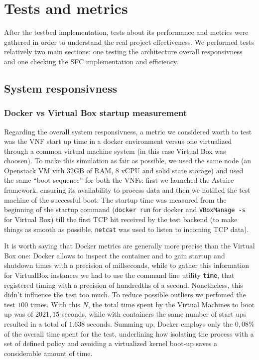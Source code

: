\chapter{Tests and metrics}

After the testbed implementation, tests about its performance and metrics were
gathered in order to understand the real project effectiveness. We performed
tests relatively two main sections: one testing the architecture overall
responsivness and one checking the SFC implementation and efficiency.

\section{System responsivness}

\subsection{Docker vs Virtual Box startup measurement}

Regarding the overall system responsivness, a metric we considered worth to 
test was the VNF start up time in a docker environment versus one virtualized 
through a common virtual machine system (in this case Virtual Box was choosen). 
To make this simulation as fair as possible, we used the same node (an 
Openstack VM vith 32GB of RAM, 8 vCPU and solid state storage) and used the same 
``boot sequence'' for both the VNFs: first we launched the Astaire framework, 
ensuring its availability to process data and then we notified the test 
machine of the successful boot. The startup time was measured from the 
beginning of the startup command (\verb!docker run! for docker and 
\verb!VBoxManage -s! for Virtual Box) till the first TCP hit received by the 
test backend (to make things as smooth as possible, \verb!netcat! was used 
to listen to incoming TCP data).

It is worth saying that Docker metrics are generally more precise than the
Virtual Box one: Docker allows to inspect the container and to gain startup and
shutdown times with a precision of millseconds, while to gather this information
for VirtualBox instances we had to use the command line utility \verb!time!,
that registered timing with a precision of hundredths of a second. Nonetheless,
this didn't influence the test too much. To reduce possible outliers we perfomed
the test $100$ times. With this $N$, the total time spent by the Virtual
Machines to boot up was of $2021,15$ seconds, while with containers the same
number of start ups resulted in a total of $1.638$ seconds. Summing up, Docker
employs only the $0,08\%$ of the overall time spent for the test, underlining
how isolating the process with a set of defined policy and avoiding a
virtualized kernel boot-up saves a considerable amount of time.

